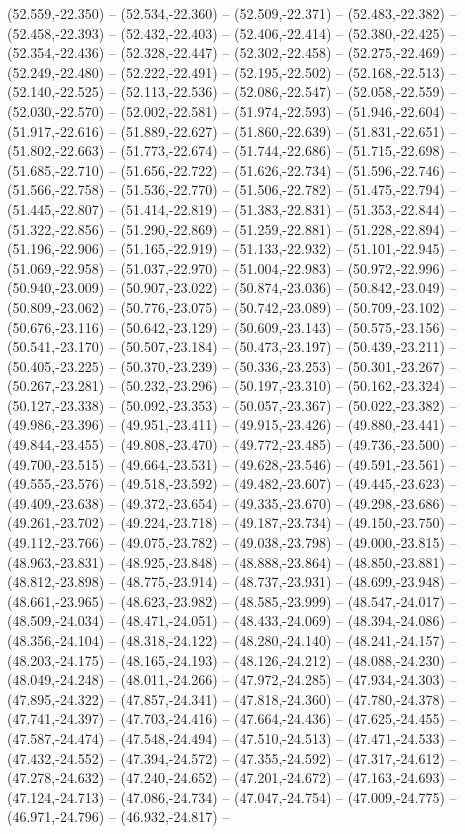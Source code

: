 (52.559,-22.350) -- (52.534,-22.360) -- (52.509,-22.371) -- (52.483,-22.382) -- (52.458,-22.393) -- (52.432,-22.403) -- (52.406,-22.414) -- (52.380,-22.425) -- (52.354,-22.436) -- (52.328,-22.447) -- (52.302,-22.458) -- (52.275,-22.469) -- (52.249,-22.480) -- (52.222,-22.491) -- (52.195,-22.502) -- (52.168,-22.513) -- (52.140,-22.525) -- (52.113,-22.536) -- (52.086,-22.547) -- (52.058,-22.559) -- (52.030,-22.570) -- (52.002,-22.581) -- (51.974,-22.593) -- (51.946,-22.604) -- (51.917,-22.616) -- (51.889,-22.627) -- (51.860,-22.639) -- (51.831,-22.651) -- (51.802,-22.663) -- (51.773,-22.674) -- (51.744,-22.686) -- (51.715,-22.698) -- (51.685,-22.710) -- (51.656,-22.722) -- (51.626,-22.734) -- (51.596,-22.746) -- (51.566,-22.758) -- (51.536,-22.770) -- (51.506,-22.782) -- (51.475,-22.794) -- (51.445,-22.807) -- (51.414,-22.819) -- (51.383,-22.831) -- (51.353,-22.844) -- (51.322,-22.856) -- (51.290,-22.869) -- (51.259,-22.881) -- (51.228,-22.894) -- (51.196,-22.906) -- (51.165,-22.919) -- (51.133,-22.932) -- (51.101,-22.945) -- (51.069,-22.958) -- (51.037,-22.970) -- (51.004,-22.983) -- (50.972,-22.996) -- (50.940,-23.009) -- (50.907,-23.022) -- (50.874,-23.036) -- (50.842,-23.049) -- (50.809,-23.062) -- (50.776,-23.075) -- (50.742,-23.089) -- (50.709,-23.102) -- (50.676,-23.116) -- (50.642,-23.129) -- (50.609,-23.143) -- (50.575,-23.156) -- (50.541,-23.170) -- (50.507,-23.184) -- (50.473,-23.197) -- (50.439,-23.211) -- (50.405,-23.225) -- (50.370,-23.239) -- (50.336,-23.253) -- (50.301,-23.267) -- (50.267,-23.281) -- (50.232,-23.296) -- (50.197,-23.310) -- (50.162,-23.324) -- (50.127,-23.338) -- (50.092,-23.353) -- (50.057,-23.367) -- (50.022,-23.382) -- (49.986,-23.396) -- (49.951,-23.411) -- (49.915,-23.426) -- (49.880,-23.441) -- (49.844,-23.455) -- (49.808,-23.470) -- (49.772,-23.485) -- (49.736,-23.500) -- (49.700,-23.515) -- (49.664,-23.531) -- (49.628,-23.546) -- (49.591,-23.561) -- (49.555,-23.576) -- (49.518,-23.592) -- (49.482,-23.607) -- (49.445,-23.623) -- (49.409,-23.638) -- (49.372,-23.654) -- (49.335,-23.670) -- (49.298,-23.686) -- (49.261,-23.702) -- (49.224,-23.718) -- (49.187,-23.734) -- (49.150,-23.750) -- (49.112,-23.766) -- (49.075,-23.782) -- (49.038,-23.798) -- (49.000,-23.815) -- (48.963,-23.831) -- (48.925,-23.848) -- (48.888,-23.864) -- (48.850,-23.881) -- (48.812,-23.898) -- (48.775,-23.914) -- (48.737,-23.931) -- (48.699,-23.948) -- (48.661,-23.965) -- (48.623,-23.982) -- (48.585,-23.999) -- (48.547,-24.017) -- (48.509,-24.034) -- (48.471,-24.051) -- (48.433,-24.069) -- (48.394,-24.086) -- (48.356,-24.104) -- (48.318,-24.122) -- (48.280,-24.140) -- (48.241,-24.157) -- (48.203,-24.175) -- (48.165,-24.193) -- (48.126,-24.212) -- (48.088,-24.230) -- (48.049,-24.248) -- (48.011,-24.266) -- (47.972,-24.285) -- (47.934,-24.303) -- (47.895,-24.322) -- (47.857,-24.341) -- (47.818,-24.360) -- (47.780,-24.378) -- (47.741,-24.397) -- (47.703,-24.416) -- (47.664,-24.436) -- (47.625,-24.455) -- (47.587,-24.474) -- (47.548,-24.494) -- (47.510,-24.513) -- (47.471,-24.533) -- (47.432,-24.552) -- (47.394,-24.572) -- (47.355,-24.592) -- (47.317,-24.612) -- (47.278,-24.632) -- (47.240,-24.652) -- (47.201,-24.672) -- (47.163,-24.693) -- (47.124,-24.713) -- (47.086,-24.734) -- (47.047,-24.754) -- (47.009,-24.775) -- (46.971,-24.796) -- (46.932,-24.817) -- 